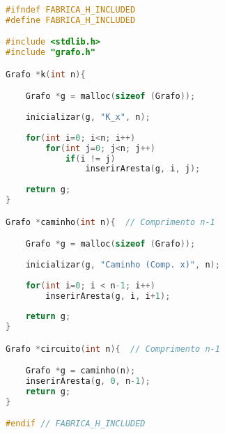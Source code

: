 \documentclass[12pt,a4paper,oneside]{article}
\begin{document}
\begin{lstlisting}[language=C]
#ifndef FABRICA_H_INCLUDED
#define FABRICA_H_INCLUDED

#include <stdlib.h>
#include "grafo.h"

Grafo *k(int n){

	Grafo *g = malloc(sizeof (Grafo));
	
	inicializar(g, "K_x", n);
	
	for(int i=0; i<n; i++)
		for(int j=0; j<n; j++)
			if(i != j)
				inserirAresta(g, i, j);
	
	return g;
}

Grafo *caminho(int n){  // Comprimento n-1

	Grafo *g = malloc(sizeof (Grafo));
	
	inicializar(g, "Caminho (Comp. x)", n);
	
	for(int i=0; i < n-1; i++)
		inserirAresta(g, i, i+1);
	
	return g;
}

Grafo *circuito(int n){  // Comprimento n-1

	Grafo *g = caminho(n);
	inserirAresta(g, 0, n-1);	
	return g;
}

#endif // FABRICA_H_INCLUDED\end{lstlisting}
\end{document}
